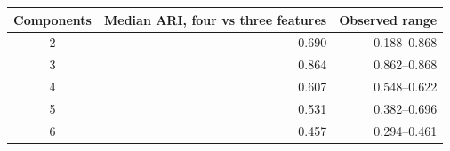\begin{tabular}{@{}crr@{}}\toprule Components & Median ARI, four vs three features & Observed range\\\midrule
2 & 0.690 & 0.188--0.868 \\
3 & 0.864 & 0.862--0.868 \\
4 & 0.607 & 0.548--0.622 \\
5 & 0.531 & 0.382--0.696 \\
6 & 0.457 & 0.294--0.461 \\
\bottomrule\end{tabular}
